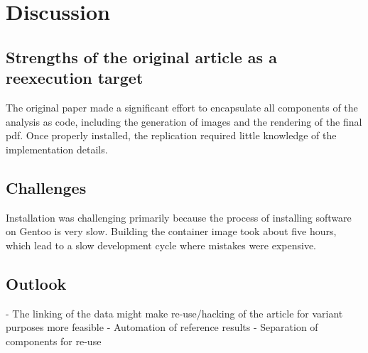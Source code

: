 \section{Discussion}

\subsection{Strengths of the original article as a reexecution target}
The original paper made a significant effort to encapsulate all
components of the analysis as code, including the generation of images
and the rendering of the final pdf. Once properly installed, the
replication required little knowledge of the implementation details.

\subsection{Challenges}
Installation was challenging primarily because the process of installing
software on Gentoo is very slow. Building the container image took
about five hours, which lead to a slow development cycle where mistakes
were expensive.

\subsection{Outlook}
- The linking of the data might make re-use/hacking of the article for variant purposes more feasible
- Automation of reference results
- Separation of components for re-use
